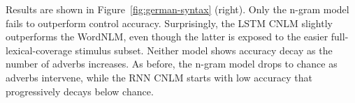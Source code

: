 %
%
Results are shown in Figure~\ref{fig:german-syntax} (right). Only the
n-gram model fails to outperform control accuracy. Surprisingly, the
LSTM CNLM slightly outperforms the WordNLM, even though the latter is
exposed to the easier full-lexical-coverage stimulus subset.  Neither
model shows accuracy decay as the number of adverbs increases.  As
before, the n-gram model drops to chance as adverbs intervene, while
the RNN CNLM starts with low accuracy that progressively decays below
chance.


